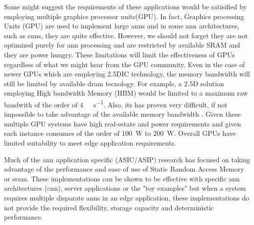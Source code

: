 Some might suggest the requirements of these applications would be satisified by employing multiple graphics processor units(GPU).
In fact, Graphics processing Units (GPU) are used to implement large \ac{ann}s and in some \ac{ann} architectures, such as \acp{cnn}, they are quite effective. However, we should not forget they are not optimized purely for \ac{ann} processing and are restricted by available SRAM and they are power hungry. These limitations will limit the effectiveness of GPUs regardless of what we might hear from the GPU community.
Even in the case of newer GPUs which are employing 2.5DIC technology, the memory bandwidth will still be limited by available \ac{dram} tecnology.
For example, a 2.5D solution employing High bandwidth Memory (HBM) would be limited to a maximum raw bandwith of the order of \SI[per-mode=symbol]{4}{\tera \bit \per \second}.
Also, its has proven very difficult, if not impossible to take advantage of the available memory bandwidth \cite{farabet2011neuflow} \cite{tensorflow2015-whitepaper}.
Given these multiple GPU systems have high real-estate and power requirements and given each instance consumes of the order of \SI{100}{\watt} to \SI{200}{\watt}.
Overall GPUs have limited suitability to meet edge application requirements.


Much of the \ac{ann} application specific (ASIC/ASIP) research has focused on taking advantage of the performance and ease of use of Static Random Access Memory or \ac{sram}. 
These implementations can be shown to be effective with specific \ac{ann} architectures (\ac{cnn}), server applications or the "toy examples" but when a system requires multiple disparate \ac{ann}s in an edge application, these implementations do not provide the required flexibility, storage capacity and deterministic performance.

\iffalse
How this work addresses the problem are outlined in section \ref{chap-five}.
\fi
\fi



